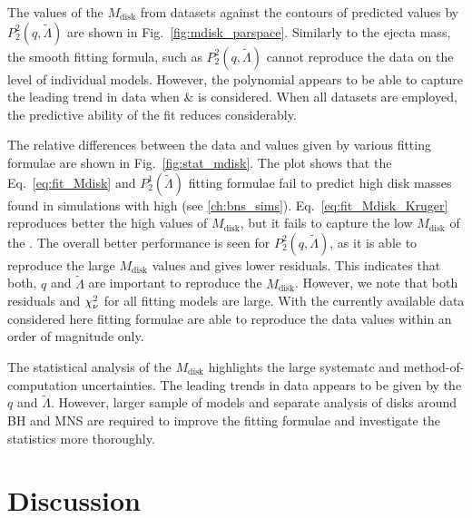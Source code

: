 The values of the $M_{\text{disk}}$ from datasets against the contours of predicted 
values by $P_2^2(q,\tilde{\Lambda})$ are shown in Fig.~\ref{fig:mdisk_parspace}.
Similarly to the ejecta mass, the smooth fitting formula, such as $P_2^2(q,\tilde{\Lambda})$
cannot reproduce the data on the level of individual models. However, the 
polynomial appears to be able to capture the leading trend in data when 
\DSrefset{} \& \DSheatcool{} is considered.
When all datasets are employed, the predictive ability of the fit reduces considerably.

The relative differences between the data and values given by various fitting formulae are 
shown in Fig.~\ref{fig:stat_mdisk}.
%
The plot shows that the Eq.~\eqref{eq:fit_Mdisk} and $P_2^1(\tilde{\Lambda})$ fitting 
formulae fail to predict high disk masses found in simulations with high \mr{} 
(see \ref{ch:bns_sims}).
Eq.~\eqref{eq:fit_Mdisk_Kruger} reproduces better the high values of $M_{\text{disk}}$, 
but it fails to capture the low $M_{\text{disk}}$ of the \DSnone{}.
%
The overall better performance is seen for $P_2^2(q,\tilde{\Lambda})$, as it is able 
to reproduce the large $M_{\text{disk}}$ values and gives lower residuals.
This indicates that both, $q$ and $\tilde{\Lambda}$ are important to reproduce the 
$M_{\text{disk}}$.
However, we note that both residuals and $\chi_{\nu}^2$ for all fitting models are large.
With the currently available data considered here fitting formulae are able to reproduce 
the data values within an order of magnitude only.

The statistical analysis of the $M_{\text{disk}}$ highlights the large systematc 
and method-of-computation uncertainties. The leading trends in data appears to be given 
by the $q$ and $\tilde{\Lambda}$. However, larger sample of models and 
separate analysis of disks around \ac{BH} and \ac{MNS} are required to improve the 
fitting formulae and investigate the statistics more thoroughly. 



\section{Discussion}


